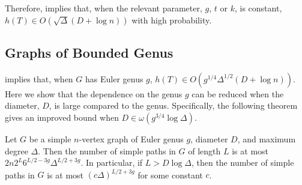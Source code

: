 \documentclass[lotsofwhite]{patmorin}
\begin{document}
Therefore,  implies that,
when the relevant parameter, $g$, $t$ or $k$, is constant, $h(T)\in
O(\sqrt{\Delta}(D+\log n))$ with high probability.  



\subsection{Graphs of Bounded Genus}

 implies that, when $G$ has Euler genus
$g$, $h(T)\in O(g^{1/4}\Delta^{1/2}(D+\log n))$.
Here we show that the dependence on the genus $g$ can be reduced when
the diameter, $D$, is large compared to the genus.  Specifically, the
following theorem gives an improved bound when $D\in\omega(g^{3/4}\log
\Delta)$.

\begin{lem}
   Let $G$ be a simple $n$-vertex graph of Euler genus $g$, diameter
   $D$, and maximum degree $\Delta$. Then the number of simple paths
   in $G$ of length $L$ is at most $2n2^{L}6^{L/2-3g}\Delta^{L/2+3g}$.
   In particular, if $L>D\log\Delta$, then the number of simple paths
   in $G$ is at most $(c\Delta)^{L/2+3g}$ for some constant $c$.
\end{lem}
\end{document}
